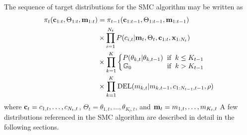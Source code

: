 \documentclass[smallcondensed, final]{svjour3}
\begin{document}
The sequence of target distributions for the SMC algorithm may be written as
\begin{equation}
\begin{split}
\pi_{t}(\bold{c}_{1:t}, \Theta_{1:t}, \bold{m}_{1:t}) & =  \pi_{t-1}(\bold{c}_{1:t-1}, \Theta_{1:t-1}, \bold{m}_{1:t-1})\\
& \times \prod_{i=1}^{N_{t}} P(c_{i,t} | \bold{m}_{t}, \Theta_{t}, \bold{c}_{1:t}, \bold{x}_{1:N_{t}}) \\
& \times \prod_{k=1}^{K} 
\begin{cases}
\begin{split}
P(\theta_{k,t} | \theta_{k,t-1}) \hspace{2mm} & \text{if} \hspace{2mm} k \leq K_{t-1} \\
\mathbb{G}_{0} \hspace{18mm} & \text{if} \hspace{2mm} k > K_{t-1}
\end{split}
\end{cases} \\
& \times \prod_{k=1}^{K} \text{DEL}(m_{k,t} | m_{k,t-1}, c_{1:N_{t-1}, t-1}, \rho)
\end{split}
\end{equation}
where $\bold{c}_{t} = c_{1,t}, \ldots, c_{N_{t}, t}$, $\Theta_{t} = \theta_{1,t}, \ldots, \theta_{K_{t}, t}$, and $\bold{m}_{t} = m_{1,t}, \ldots, m_{K_{t}, t}$ A few distributions referenced in the SMC algorithm are described in detail in the following sections.
\end{document}
